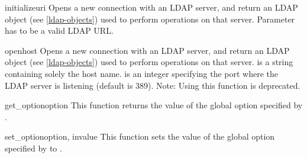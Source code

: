 
\begin{funcdesc}{initialize}{uri} %
  Opens a new connection with an LDAP server, and return an LDAP object
  (see \ref{ldap-objects}) used to perform operations on that server.
  Parameter  has to be a valid LDAP URL.
  \begin{seealso}
  \end{seealso}
\end{funcdesc}

\begin{funcdesc}{open}{host } %
  Opens a new connection with an LDAP server, and return an LDAP object
  (see \ref{ldap-objects}) used to perform operations on that server.
   is a string containing solely the host name. 
  is an integer specifying the port where the LDAP server is
  listening (default is 389).
  Note: Using this function is deprecated.
\end{funcdesc}

\begin{funcdesc}{get_option}{option} %
  This function returns the value of the global option
  specified by .
\end{funcdesc}

\begin{funcdesc}{set_option}{option, invalue} %
  This function sets the value of the global option
  specified by  to .
\end{funcdesc}



